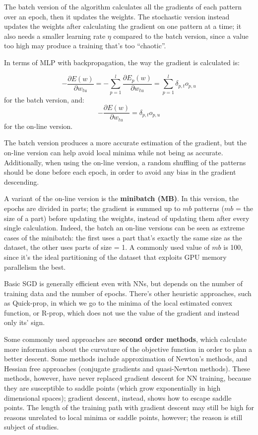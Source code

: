 The batch version of the algorithm calculates all the gradients of each pattern over an epoch, then it updates the weights. The stochastic version instead updates the weights after calculating the gradient on one pattern at a time; it also needs a smaller learning rate $\eta$ compared to the batch version, since a value too high may produce a training that's too ``chaotic''.

In terms of MLP with backpropagation, the way the gradient is calculated is:

\begin{equation*}
    - \dfrac{\partial E(w)}{\partial w_{tu}} = - \sum_{p=1}^l \dfrac{\partial E_p(w)}{\partial w_{tu}} = \sum_{p=1}^l \delta_{p,t} o_{p,u}
\end{equation*}
for the batch version, and:
\begin{equation*}
    - \dfrac{\partial E(w)}{\partial w_{tu}} = \delta_{p,t} o_{p,u}
\end{equation*}
for the on-line version.

The batch version produces a more accurate estimation of the gradient, but the on-line version can help avoid local minima while not being as accurate. Additionally, when using the on-line version, a random shuffling of the patterns should be done before each epoch, in order to avoid any bias in the gradient descending.

A variant of the on-line version is the \textbf{minibatch (MB)}. In this version, the epochs are divided in parts; the gradient is summed up to $mb$ patterns ($mb$ = the size of a part) before updating the weights, instead of updating them after every single calculation. Indeed, the batch an on-line versions can be seen as extreme cases of the minibatch: the first uses a part that's exactly the same size as the dataset, the other uses parts of size = 1. A commonly used value of $mb$ is 100, since it's the ideal partitioning of the dataset that exploits GPU memory parallelism the best.

Basic SGD is generally efficient even with NNs, but depends on the number of training data and the number of epochs. There's other heuristic approaches, such as Quick-prop, in which we go to the minima of the local estimated convex function, or R-prop, which does not use the value of the gradient and instead only its' sign.

Some commonly used approaches are \textbf{second order methods}, which calculate more information about the curvature of the objective function in order to plan a better descent. Some methods include approximation of Newton's methods, and Hessian free approaches (conjugate gradients and quasi-Newton methods). These methods, however, have never replaced gradient descent for NN training, because they are susceptible to saddle points (which grow exponentially in high dimensional spaces); gradient descent, instead, shows how to escape saddle points. The length of the training path with gradient descent may still be high for reasons unrelated to local minima or saddle points, however; the reason is still subject of studies. 

